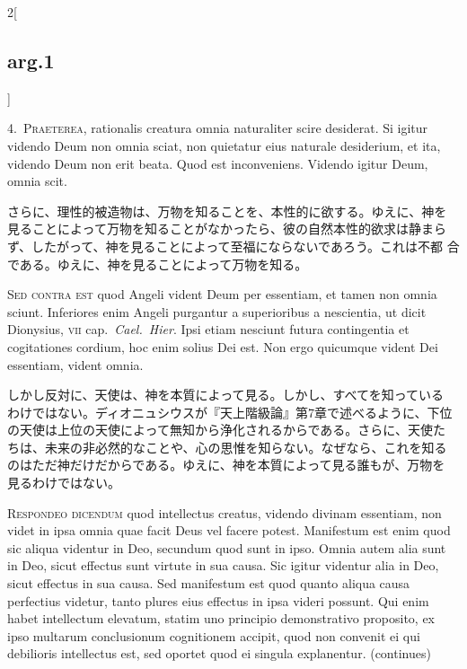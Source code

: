 \documentclass[paper=a4paper,fontsize=10pt,jafontsize=9pt,titlepage]{jlreq}
\begin{document}
\begin{paracol}{2}[\subsection{arg.1}]

4.~{\scshape Praeterea}, rationalis creatura omnia naturaliter scire
desiderat. Si igitur videndo Deum non omnia sciat, non quietatur eius
naturale desiderium, et ita, videndo Deum non erit beata. Quod est
inconveniens. Videndo igitur Deum, omnia scit.

\switchcolumn

さらに、理性的被造物は、万物を知ることを、本性的に欲する。ゆえに、神を
見ることによって万物を知ることがなかったら、彼の自然本性的欲求は静まら
ず、したがって、神を見ることによって至福にならないであろう。これは不都
合である。ゆえに、神を見ることによって万物を知る。

\switchcolumn*[\subsection{s.c.}]

{\scshape Sed contra est} quod Angeli vident Deum per essentiam, et tamen
non omnia sciunt. Inferiores enim Angeli purgantur a superioribus a
nescientia, ut dicit Dionysius, {\scshape vii} cap.\ {\itshape Cael.\
Hier}. Ipsi etiam nesciunt futura contingentia et cogitationes
cordium, hoc enim solius Dei est. Non ergo quicumque vident Dei
essentiam, vident omnia.

\switchcolumn

しかし反対に、天使は、神を本質によって見る。しかし、すべてを知っている
わけではない。ディオニュシウスが『天上階級論』第7章で述べるように、下位
の天使は上位の天使によって無知から浄化されるからである。さらに、天使た
ちは、未来の非必然的なことや、心の思惟を知らない。なぜなら、これを知る
のはただ神だけだからである。ゆえに、神を本質によって見る誰もが、万物を
見るわけではない。


{\scshape Respondeo dicendum} quod intellectus creatus, videndo divinam
essentiam, non videt in ipsa omnia quae facit Deus vel facere
potest. Manifestum est enim quod sic aliqua videntur in Deo, secundum
quod sunt in ipso. Omnia autem alia sunt in Deo, sicut effectus sunt
virtute in sua causa. Sic igitur videntur alia in Deo, sicut effectus
in sua causa. Sed manifestum est quod quanto aliqua causa perfectius
videtur, tanto plures eius effectus in ipsa videri possunt. Qui enim
habet intellectum elevatum, statim uno principio demonstrativo
proposito, ex ipso multarum conclusionum cognitionem accipit, quod non
convenit ei qui debilioris intellectus est, sed oportet quod ei
singula explanentur. (continues)


\end{paracol}
\end{document}
